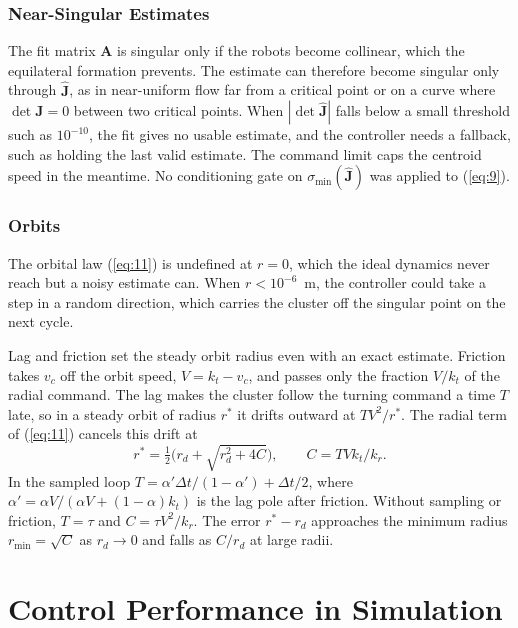\documentclass[lettersize,journal]{IEEEtran}
\newcommand{\rev}[1]{#1}                             %
\newcommand{\newnum}[1]{\textcolor{blue}{#1}}        %
\begin{document}
\subsubsection{Near-Singular Estimates}
The fit matrix $\mathbf{A}$ is singular only if the robots become collinear, which the equilateral formation prevents. The estimate can therefore become singular only through $\hat{\mathbf{J}}$, as in near-uniform flow far from a critical point or on a curve where $\det\mathbf{J} = 0$ between two critical points. When $|\det\hat{\mathbf{J}}|$ falls below a small threshold such as $10^{-10}$, the fit gives no usable estimate, and the controller needs a fallback, such as holding the last valid estimate.
The command limit caps the centroid speed in the meantime. No conditioning gate on $\sigma_{\min}(\hat{\mathbf{J}})$ was applied to (\ref{eq:9}).

\subsubsection{Orbits}
The orbital law (\ref{eq:11}) is undefined at $r = 0$, which the ideal dynamics never reach but a noisy estimate can. When $r < 10^{-6}$~m, the controller could take a step in a random direction, which carries the cluster off the singular point on the next cycle.

Lag and friction set the steady orbit radius even with an exact estimate. Friction takes $v_c$ off the orbit speed, $V = k_t - v_c$, and passes only the fraction $V/k_t$ of the radial command. The lag makes the cluster follow the turning command a time $T$ late, so in a steady orbit of radius $r^*$ it drifts outward at $TV^2/r^*$. The radial term of (\ref{eq:11}) cancels this drift at
\begin{equation}\label{eq:orbit_cf}
r^* = \tfrac{1}{2}\bigl(r_d + \sqrt{r_d^2 + 4C}\bigr), \qquad C = TVk_t/k_r.
\end{equation}
In the sampled loop $T = \alpha'\Delta t/(1-\alpha') + \Delta t/2$, where $\alpha' = \alpha V/(\alpha V + (1-\alpha)k_t)$ is the lag pole after friction. Without sampling or friction, $T = \tau$ and $C = \tau V^2/k_r$. The error $r^* - r_d$ approaches the minimum radius $r_{\min} = \sqrt{C}$ as $r_d \to 0$ and falls as $C/r_d$ at large radii.



\section{Control Performance in Simulation}
\end{document}
